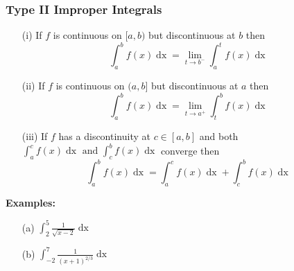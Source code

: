\documentclass{beamer}
\begin{document}
\begin{frame}
\frametitle{Type II Improper Integrals}
\begin{itemize}
	\item[(i)]If $f$ is continuous on $[a,b)$ but discontinuous at $b$ then
	$$\int_a^bf(x) \mathop{dx} = \lim\limits_{t \to b^-} \int_{a}^{t}f(x)\mathop{dx}$$
	\item[(ii)]If $f$ is continuous on $(a,b]$ but discontinuous at $a$ then
	$$\int_a^bf(x) \mathop{dx} = \lim\limits_{t \to a^+} \int_{t}^{b}f(x)\mathop{dx}$$
	\item[(iii)] If $f$ has a discontinuity at $c \in [a,b]$ and both $\int_{a}^{c}f(x) \mathop{dx} \mbox{ and } \int_{c}^{b}f(x) \mathop{dx}$ converge then
	$$\int_a^bf(x) \mathop{dx} = \int_{a}^{c} f(x) \mathop{dx} + \int_{c}^{b} f(x) \mathop{dx}$$
\end{itemize}

\textbf{Examples:}
\begin{itemize}
	\item[(a)] $\int_{2}^{5}\frac{1}{\sqrt{x-2}} \mathop{dx}$
	\item[(b)] $\int_{-2}^{7}\frac{1}{(x+1)^{2/3}} \mathop{dx}$ 
\end{itemize}
\end{frame}

%		
%		
%
%
%
%
\end{document}
